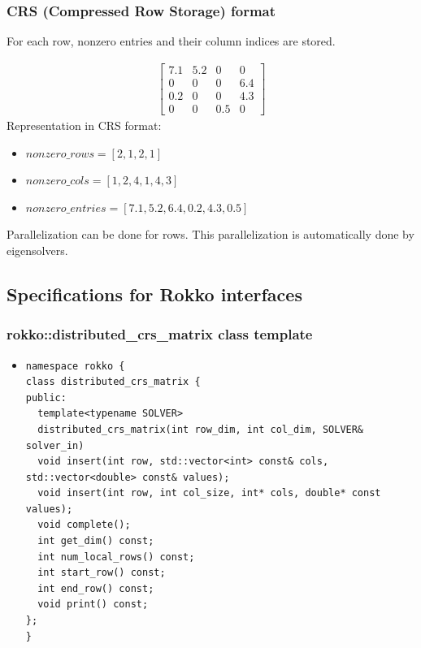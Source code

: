 \begin{frame}[c,fragile]
  \frametitle{CRS (Compressed Row Storage) format}
For each row, nonzero entries and their column indices are stored.

\begin{rei}%
\vspace{-2\baselineskip}
\begin{align*}
\begin{bmatrix}
7.1 & 5.2 & 0 & 0 \\
0 & 0 & 0 & 6.4 \\
0.2 & 0 & 0 & 4.3 \\
0 & 0 & 0.5 & 0
\end{bmatrix}
\end{align*}
Representation in CRS format:
\begin{itemize}
\item $nonzero\_rows = [2, 1, 2, 1]$
\item $nonzero\_cols = [1, 2, 4, 1, 4, 3]$
\item $nonzero\_entries = [7.1, 5.2, 6.4, 0.2, 4.3, 0.5]$
\end{itemize}
\end{rei}

Parallelization can be done for rows.
This parallelization is automatically done by eigensolvers.

\end{frame}

\subsection{Specifications for Rokko interfaces}

\begin{frame}[c,fragile]
  \frametitle{rokko::distributed_crs_matrix class template}
  \begin{itemize}
  \item {}
\begin{lstlisting}
namespace rokko {
class distributed_crs_matrix {
public:
  template<typename SOLVER>
  distributed_crs_matrix(int row_dim, int col_dim, SOLVER& solver_in)
  void insert(int row, std::vector<int> const& cols, std::vector<double> const& values);
  void insert(int row, int col_size, int* cols, double* const values);
  void complete();
  int get_dim() const;
  int num_local_rows() const;
  int start_row() const;
  int end_row() const;
  void print() const;
};
}
\end{lstlisting}
  \end{itemize}
\end{frame}


